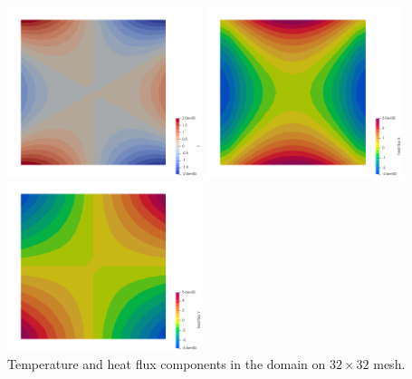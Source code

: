 \begin{center}
\includegraphics[width=5.7cm]{python_codes/fieldstone_173/results/exp5/T}
\includegraphics[width=5.7cm]{python_codes/fieldstone_173/results/exp5/qx}
\includegraphics[width=5.7cm]{python_codes/fieldstone_173/results/exp5/qy}\\
{\captionfont Temperature and heat flux components in the domain on $32 \times 32$ mesh.}
\end{center}

